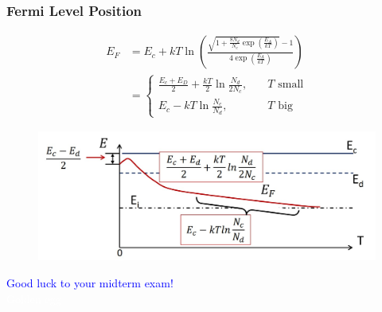 \documentclass{beamer}
\begin{document}
    \begin{frame} \frametitle{Fermi Level Position}
        \begin{equation*}
            \begin{aligned}
                E_F &= E_c + kT \ln \left( \frac{\sqrt{1 + \frac{8 N_d}{N_c} \exp\left( \frac{E_A}{kT}  \right)} - 1}{4 \exp\left( \frac{E_A}{kT}  \right)}  \right) \\
                &= \left\{
                    \begin{aligned}
                        \frac{E_c + E_D}{2} +\frac{kT}{2} \ln \frac{N_d}{2N_c}, &\quad  T \text{ small} \\
                        E_c - kT \ln \frac{N_c}{N_d}, &\quad  T \text{ big}
                    \end{aligned}
                \right.
            \end{aligned}
        \end{equation*}
        \begin{figure}[H]
            \centering
            \includegraphics[width=0.8\linewidth]{Fermi-level-position.jpg}
            \label{fig:Fermi-level-position.jpg}
        \end{figure}
    \end{frame}





    \begin{frame} 
        \begin{center}
            \Large\textcolor{blue}{Good luck to your midterm exam!} \\
            \textcolor{white}{Golden egg} 
        \end{center}
    \end{frame}
\end{document}
